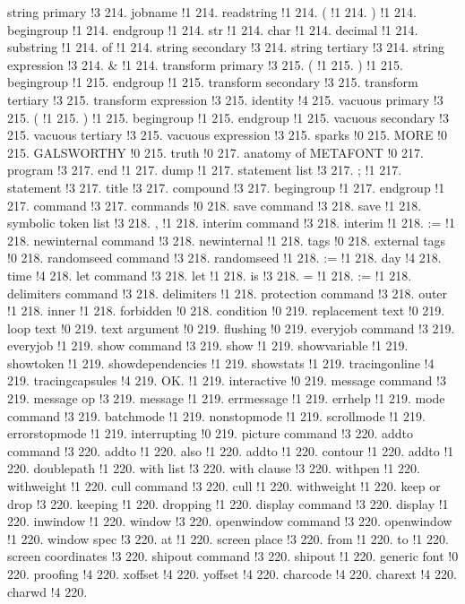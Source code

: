 string primary !3 214.
jobname !1 214.
readstring !1 214.
( !1 214.
) !1 214.
begingroup !1 214.
endgroup !1 214.
str !1 214.
char !1 214.
decimal !1 214.
substring !1 214.
of !1 214.
string secondary !3 214.
string tertiary !3 214.
string expression !3 214.
\& !1 214.
transform primary !3 215.
( !1 215.
) !1 215.
begingroup !1 215.
endgroup !1 215.
transform secondary !3 215.
transform tertiary !3 215.
transform expression !3 215.
identity !4 215.
vacuous primary !3 215.
( !1 215.
) !1 215.
begingroup !1 215.
endgroup !1 215.
vacuous secondary !3 215.
vacuous tertiary !3 215.
vacuous expression !3 215.
sparks !0 215.
MORE !0 215.
GALSWORTHY !0 215.
truth !0 217.
anatomy of METAFONT !0 217.
program !3 217.
end !1 217.
dump !1 217.
statement list !3 217.
; !1 217.
statement !3 217.
title !3 217.
compound !3 217.
begingroup !1 217.
endgroup !1 217.
command !3 217.
commands !0 218.
save command !3 218.
save !1 218.
symbolic token list !3 218.
, !1 218.
interim command !3 218.
interim !1 218.
:= !1 218.
newinternal command !3 218.
newinternal !1 218.
tags !0 218.
external tags !0 218.
randomseed command !3 218.
randomseed !1 218.
:= !1 218.
day !4 218.
time !4 218.
let command !3 218.
let !1 218.
is !3 218.
= !1 218.
:= !1 218.
delimiters command !3 218.
delimiters !1 218.
protection command !3 218.
outer !1 218.
inner !1 218.
forbidden !0 218.
condition !0 219.
replacement text !0 219.
loop text !0 219.
text argument !0 219.
flushing !0 219.
everyjob command !3 219.
everyjob !1 219.
show command !3 219.
show !1 219.
showvariable !1 219.
showtoken !1 219.
showdependencies !1 219.
showstats !1 219.
tracingonline !4 219.
tracingcapsules !4 219.
OK. !1 219.
interactive !0 219.
message command !3 219.
message op !3 219.
message !1 219.
errmessage !1 219.
errhelp !1 219.
mode command !3 219.
batchmode !1 219.
nonstopmode !1 219.
scrollmode !1 219.
errorstopmode !1 219.
interrupting !0 219.
picture command !3 220.
addto command !3 220.
addto !1 220.
also !1 220.
addto !1 220.
contour !1 220.
addto !1 220.
doublepath !1 220.
with list !3 220.
with clause !3 220.
withpen !1 220.
withweight !1 220.
cull command !3 220.
cull !1 220.
withweight !1 220.
keep or drop !3 220.
keeping !1 220.
dropping !1 220.
display command !3 220.
display !1 220.
inwindow !1 220.
window !3 220.
openwindow command !3 220.
openwindow !1 220.
window spec !3 220.
at !1 220.
screen place !3 220.
from !1 220.
to !1 220.
screen coordinates !3 220.
shipout command !3 220.
shipout !1 220.
generic font !0 220.
proofing !4 220.
xoffset !4 220.
yoffset !4 220.
charcode !4 220.
charext !4 220.
charwd !4 220.
